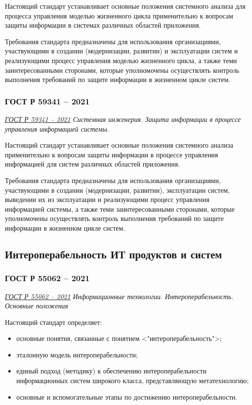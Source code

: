 Настоящий стандарт устанавливает основные положения системного анализа
для процесса управления моделью жизненного цикла применительно
к вопросам защиты информации в системах различных областей приложения.

Требования стандарта предназначены для использования организациями,
участвующими в создании (модернизации, развитии) и эксплуатации систем
и реализующими процесс управления моделью жизненного цикла,
а также теми заинтересованными сторонами,
которые уполномочены осуществлять контроль выполнения требований
по защите информации в жизненном цикле систем.

\subsubsection{ГОСТ Р 59341 -- 2021}

\emph{\href{https://docs.cntd.ru/document/1200179545}{ГОСТ Р 59341 -- 2021}
Системная инженерия.
Защита информации в процессе управления информацией системы.
}

Настоящий стандарт устанавливает основные положения
системного анализа применительно к вопросам защиты информации
в процессе управления информацией для систем различных областей приложения.

Требования стандарта предназначены для использования организациями,
участвующими в создании (модернизации, развитии),
эксплуатации систем, выведении их из эксплуатации
и реализующими процесс управления информацией системы,
а также теми заинтересованными сторонами,
которые уполномочены осуществлять контроль выполнения требований
по защите информации в жизненном цикле систем.

\subsection{Интероперабельность ИТ продуктов и систем}

\subsubsection{ГОСТ Р 55062 -- 2021}

\emph{\href{https://docs.cntd.ru/document/1200181340}{ГОСТ Р 55062 -- 2021}
Информационные технологии. Интероперабельность. Основные положения
}

Настоящий стандарт определяет:

\begin{itemize}
	\item основные понятия, связанные с понятием <"интероперабельность">;
	\item эталонную модель интероперабельности;
	\item единый подход (методику) к обеспечению интероперабельности
		информационных систем широкого класса, представляющую метатехнологию;
	\item основные и вспомогательные этапы по достижению интероперабельности.
\end{itemize}

